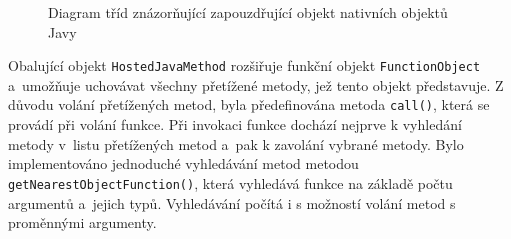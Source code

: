 \begin{figure}[H]
  \begin{center}
    \caption{Diagram tříd znázorňující zapouzdřující objekt nativních objektů Javy}
    \label{Figure.HostedJavaObject}
  \end{center}
\end{figure}

\vspace{-1em}

Obalující objekt \texttt{HostedJavaMethod} rozšiřuje funkční objekt \texttt{FunctionObject} a~umožňuje uchovávat všechny přetížené metody, jež tento objekt představuje. Z důvodu volání přetížených metod, byla předefinována metoda \texttt{call()}, která se provádí při volání funkce. Při invokaci funkce dochází nejprve k vyhledání metody v~listu přetížených metod a~pak k zavolání vybrané metody. Bylo implementováno jednoduché vyhledávání metod metodou \texttt{getNearestObjectFunction()}, která vyhledává funkce na základě počtu argumentů a~jejich typů. Vyhledávání počítá i s možností volání metod s proměnnými argumenty.

